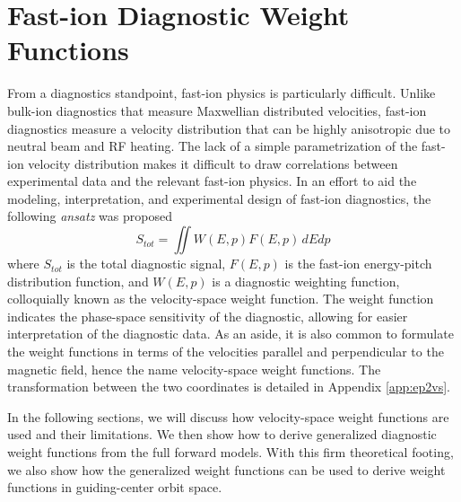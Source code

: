 \chapter{Fast-ion Diagnostic Weight Functions}\label{chap:weights}

From a diagnostics standpoint, fast-ion physics is particularly difficult.
Unlike bulk-ion diagnostics that measure Maxwellian distributed velocities, fast-ion diagnostics  measure a velocity distribution that can be highly anisotropic due to neutral beam and RF heating.
The lack of a simple parametrization of the fast-ion velocity distribution makes it difficult to draw correlations between experimental data and the relevant fast-ion physics.
In an effort to aid the modeling, interpretation, and experimental design of fast-ion diagnostics, the following \textit{ansatz} was proposed\cite{heidbrink2007}
\begin{equation}\label{eq:vs_WF}
    S_{tot} = \iint W(E,p)F(E,p)\,dEdp
\end{equation}
where $S_{tot}$ is the total diagnostic signal, $F(E,p)$ is the fast-ion energy-pitch distribution function, and $W(E,p)$ is a diagnostic weighting function, colloquially known as the velocity-space weight function. The weight function indicates the phase-space sensitivity of the diagnostic, allowing for easier interpretation of the diagnostic data. As an aside, it is also common to formulate the weight functions in terms of the velocities parallel and perpendicular to the magnetic field, hence the name velocity-space weight functions. The transformation between the two coordinates is detailed in Appendix \ref{app:ep2vs}.

In the following sections, we will discuss how velocity-space weight functions are used and their limitations. We then show how to derive generalized diagnostic weight functions from the full forward models. With this firm theoretical footing, we also show how the generalized weight functions can be used to derive weight functions in guiding-center orbit space.

